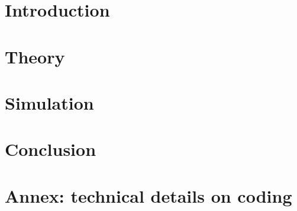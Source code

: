 
\usepackage[citestyle=phys,natbib=true, backend=bibtex]{biblatex}




\graphicspath{{../pictures/}}

\clearpage\titleGP\thispagestyle{empty}
\newpage\null\thispagestyle{empty}\newpage
\clearpage\tableofcontents\thispagestyle{empty}
\newpage\null\thispagestyle{empty}\newpage

\setcounter{page}{1} 

\newlength{\oldindent}
\setlength{\oldindent}{\parindent}

\chapter*{Introduction}



\newpage\null\thispagestyle{empty}\newpage
\chapter{Theory} %





\newpage\null\thispagestyle{empty}\newpage

\chapter{Simulation} 





\newpage\null\thispagestyle{empty}\newpage

\chapter*{Conclusion}



\newpage\null\thispagestyle{empty}\newpage

\chapter*{Annex: technical details on coding}

